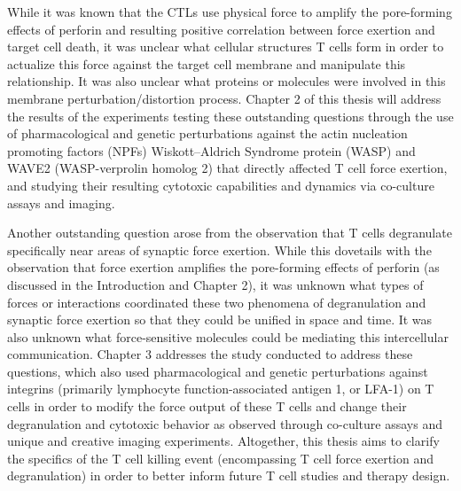 While it was known that the CTLs use physical force to amplify the pore-forming effects of perforin and resulting positive correlation between force exertion and  target cell death, it was unclear what cellular structures T cells form in order to actualize this force against the target cell membrane and manipulate this relationship. It was also unclear what proteins or molecules were involved in this membrane perturbation/distortion process. Chapter 2 of this thesis will address the results of the experiments testing these outstanding questions through the use of pharmacological and genetic perturbations against the actin nucleation promoting factors (NPFs) Wiskott–Aldrich Syndrome protein (WASP) and WAVE2 (WASP-verprolin homolog 2) that directly affected T cell force exertion, and studying their resulting cytotoxic capabilities and dynamics via co-culture assays and imaging.

Another outstanding question arose from the observation that T cells degranulate specifically near areas of synaptic force exertion. While this dovetails with the observation that force exertion amplifies the pore-forming effects of perforin (as discussed in the Introduction and Chapter 2), it was unknown what types of forces or interactions coordinated these two phenomena of degranulation and synaptic force exertion so that they could be unified in space and time. It was also unknown what force-sensitive molecules could be mediating this intercellular communication. Chapter 3 addresses the study conducted to address these questions, which also used pharmacological and genetic perturbations against integrins (primarily lymphocyte function-associated antigen 1, or LFA-1) on T cells in order to modify the force output of these T cells and change their degranulation and cytotoxic behavior as observed through co-culture assays and unique and creative imaging experiments. Altogether, this thesis aims to clarify the specifics of the T cell killing event (encompassing T cell force exertion and degranulation) in order to better inform future T cell studies and therapy design.
